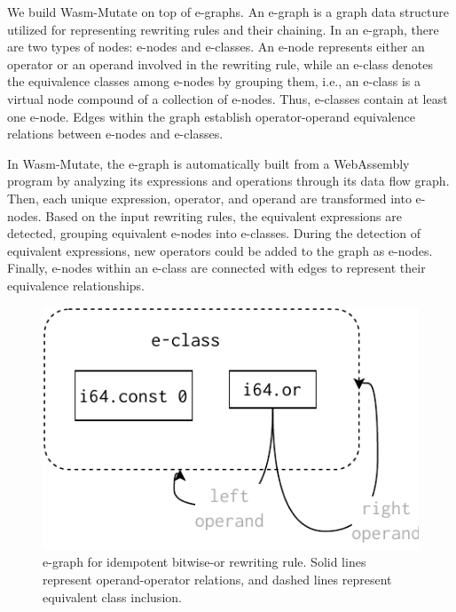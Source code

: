 \documentclass[sigplan,screen]{acmart}
\newcommand{\tool}{{\sc Wasm-Mutate}\xspace}
\begin{document}
We build \tool on top of e-graphs.
An e-graph is a graph data structure utilized for representing rewriting rules \cite{10.1145/3571207} and their chaining. 
In an e-graph, there are two types of nodes: e-nodes and e-classes. 
An e-node represents either an operator or an operand involved in the rewriting rule, while an e-class denotes the equivalence classes among e-nodes by grouping them, i.e., an e-class is a virtual node compound of a collection of e-nodes. 
Thus, e-classes contain at least one e-node.
Edges within the graph establish operator-operand equivalence relations between e-nodes and e-classes.

In \tool, the e-graph is automatically built from a WebAssembly program by analyzing its expressions and operations through its data flow graph.
Then, each unique expression, operator, and operand are transformed into e-nodes.
Based on the input rewriting rules, the equivalent expressions are detected, grouping equivalent e-nodes into e-classes.
During the detection of equivalent expressions, new operators could be added to the graph as e-nodes.
Finally, e-nodes within an e-class are connected with edges to represent their equivalence relationships.

\begin{figure}
    \centering
    \includegraphics[width=0.7\linewidth]{figures/egraph1.pdf}
    \caption{e-graph for idempotent bitwise-or rewriting rule. Solid lines represent operand-operator relations, and dashed lines represent equivalent class inclusion. }
  \label{e-graph}
\end{figure}
\end{document}

